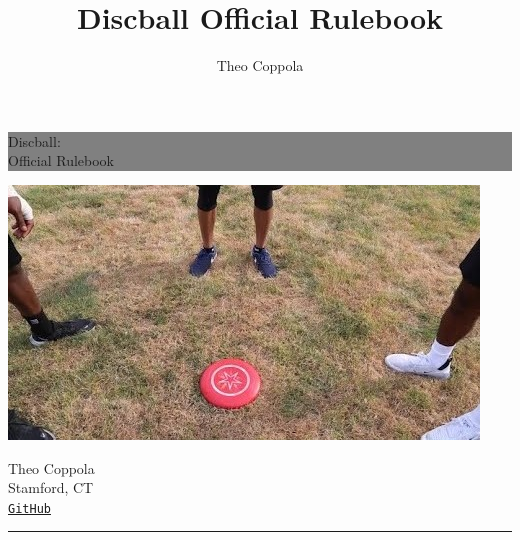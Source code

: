 \documentclass[10pt]{article}
\title{Discball Official Rulebook}
\author{Theo Coppola}
\begin{document}
    \begin{titlepage} %

        \colorbox{grey}{
            \parbox[t]{0.93\textwidth}{ %
                \parbox[t]{0.91\textwidth}{ %
                    \raggedleft%
                    \fontsize{50pt}{80pt}\selectfont %
                    \vspace{0.7cm} %
                    
                    Discball:\\
                    Official Rulebook\\
                    
                    \vspace{0.7cm} %
                }
            }
        }
        
        \vfill
        
        \begin{center}
            \includegraphics{title_image}
        \end{center}
        
        \vfill %
        
        \parbox[t]{0.93\textwidth}{ %
            \raggedleft%
            \large%
            {\Large Theo Coppola}\\[4pt] %
            Stamford, CT\\[4pt] %
            \texttt{\href{https://github.com/tjcoppola234/Discball}{GitHub}}\\
            
            \hfill\rule{0.2\linewidth}{1pt}%
        }
        
    \end{titlepage}
\end{document}
